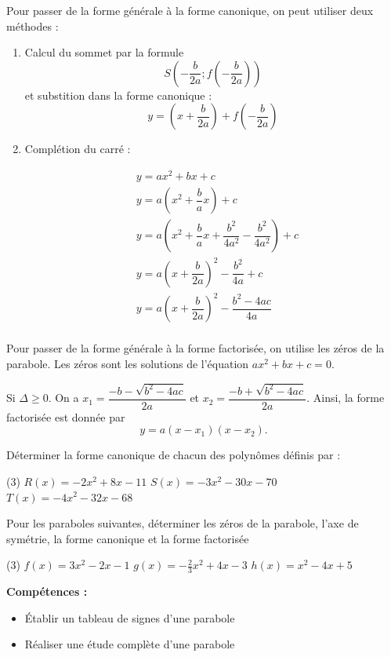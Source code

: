 \documentclass[a4paper,12pt]{report}
\begin{document}
    \begin{rem}
    	Pour passer de la forme générale à la forme canonique, on peut utiliser deux méthodes : 
	\begin{enumerate}
		\item Calcul du sommet par la formule \[S\left(-\dfrac{b}{2a};f\left(-\dfrac{b}{2a}\right)\right)\] et substition dans la forme canonique : 
        \[y=\left(x+\dfrac{b}{2a}\right)+f\left(-\dfrac{b}{2a}\right)\]
\item Complétion du carré :

       \begin{align*}
        &y=ax^2+bx+c\\
        &y=a\left(x^2+\dfrac{b}{a}x\right)+c\\
        &y=a\left(x^2+ \dfrac{b}{a}x+\dfrac{b^2 }{4a^2 }-\dfrac{b^2 }{4a^2 }\right)+c\\
        &y=a\left(x+\dfrac{b}{2a}\right)^2 -\dfrac{b^2 }{4a}+c\\
	&y=a\left(x+\dfrac{b}{2a}\right)^2 -\dfrac{b^2 -4ac}{4a}\\
        \end{align*}
	\end{enumerate}
    \end{rem}
    \begin{rem}
    Pour passer de la forme générale à la forme factorisée, on utilise les zéros de la parabole. Les zéros sont les solutions de l'équation $ax^2+bx+c=0$. 

Si $\Delta\geq 0$. On a $x_1=\dfrac{-b-\sqrt{b^2-4ac}}{2a}$ et $x_2=\dfrac{-b+\sqrt{b^2-4ac}}{2a}$. Ainsi, la forme factorisée est donnée par \[y=a(x-x_1)(x-x_2).\]
    \end{rem}
    \begin{boiteExT}[Étude de la parabole $f(x)=\dfrac{3}{2}x^2-\dfrac{3}{2}x-3$]
	\vspace{10cm}
\end{boiteExT}
\begin{exo}
	Déterminer la forme canonique de chacun des polynômes définis par :
	\begin{tasks}(3)		
\task $R(x)=-2 x^2+8 x-11$
\task $S(x)=-3 x^2-30 x-70$
\task $T(x)=-4 x^2-32 x-68$
	\end{tasks}
\end{exo}
\begin{exo}
	Pour les paraboles suivantes, déterminer les zéros de la parabole, l'axe de symétrie, la forme canonique et la forme factorisée
	\begin{tasks}(3)
\task $f(x)=3 x^2-2 x-1$
\task $g(x)=-\frac{2}{3} x^2+4 x-3$
\task $h(x)=x^2-4 x+5$
\end{tasks}
\end{exo}
\newpage
    {\bfseries Compétences :}
 \begin{itemize}
	 \item Établir un tableau de signes d'une parabole
	 \item Réaliser une étude complète d'une parabole
 \end{itemize}
\end{document}
